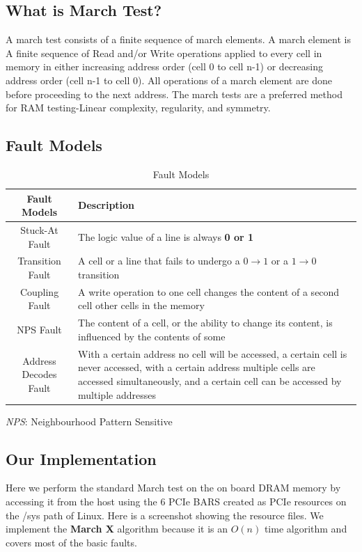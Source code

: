 \subsection{What is March Test?}

A march test consists of a finite sequence of march elements. A march element is A finite sequence of Read and/or Write operations applied
to every cell in memory in either increasing address order (cell 0 to cell n-1) or decreasing address order (cell n-1 to cell 0). All
operations of a march element are done before proceeding to the next address. The march tests are a preferred method for RAM testing-Linear
complexity, regularity, and symmetry.

\subsection{Fault Models}
\begin{table}[H]
\begin{tabular}{c | m{}}
\hline
Fault Models & Description \\
\hline
Stuck-At Fault & The logic value of a line is always \textbf{0 or 1}\\
Transition Fault & A cell or a line that fails to undergo a $0 \rightarrow 1$ or a $1 \rightarrow 0$ transition \\
Coupling Fault & A write operation to one cell changes the content of a second cell other cells in the memory \\
NPS Fault & The content of a cell, or the ability to change its content, is influenced by the contents of some\\
Address Decodes Fault & With a certain address no cell will be accessed, a certain cell is never accessed, with a certain address multiple
cells are accessed simultaneously, and a certain cell can be accessed by multiple addresses
\end{tabular}
\caption{Fault Models}
\end{table}

\textit{NPS}: Neighbourhood Pattern Sensitive

\subsection{Our Implementation}
Here we perform the standard March test on the on board DRAM memory by accessing it from the host using the 6 PCIe BARS created as PCIe
resources on the /sys path of Linux. Here is a screenshot showing the resource files. We implement the \textbf{March X} algorithm because it
is an $O(n)$ time algorithm and covers most of the basic faults.

